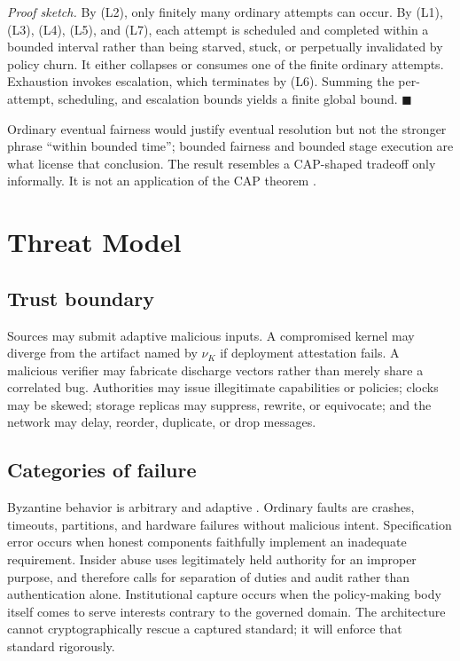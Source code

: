 \documentclass[11pt,openany]{book}
\begin{document}
\emph{Proof sketch.} By (L2), only finitely many ordinary attempts can occur.
By (L1), (L3), (L4), (L5), and (L7), each attempt is scheduled and completed
within a bounded interval rather than being starved, stuck, or perpetually
invalidated by policy churn. It either collapses or consumes one of the finite
ordinary attempts. Exhaustion invokes escalation, which terminates by (L6).
Summing the per-attempt, scheduling, and escalation bounds yields a finite
global bound. \(\blacksquare\)

Ordinary eventual fairness would justify eventual resolution but not the
stronger phrase “within bounded time”; bounded fairness and bounded stage
execution are what license that conclusion. The result resembles a CAP-shaped
tradeoff only informally. It is not an application of the CAP theorem
\cite{gilbert-lynch}.

\chapter{Threat Model}
\section{Trust boundary}
Sources may submit adaptive malicious inputs. A compromised kernel may diverge
from the artifact named by \(\nu_K\) if deployment attestation fails. A
malicious verifier may fabricate discharge vectors rather than merely share a
correlated bug. Authorities may issue illegitimate capabilities or policies;
clocks may be skewed; storage replicas may suppress, rewrite, or equivocate;
and the network may delay, reorder, duplicate, or drop messages.

\section{Categories of failure}
Byzantine behavior is arbitrary and adaptive \cite{lamport-byzantine}.
Ordinary faults are crashes,
timeouts, partitions, and hardware failures without malicious intent.
Specification error occurs when honest components faithfully implement an
inadequate requirement. Insider abuse uses legitimately held authority for an
improper purpose, and therefore calls for separation of duties and audit rather
than authentication alone. Institutional capture occurs when the policy-making
body itself comes to serve interests contrary to the governed domain. The
architecture cannot cryptographically rescue a captured standard; it will
enforce that standard rigorously.
\end{document}
